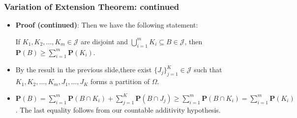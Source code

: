 \documentclass[handout]{beamer}
\newcommand{\BP}{\mathbf{P}}
\begin{document}
\frame
{
  \frametitle{Variation of Extension Theorem: continued}

   \begin{itemize}

       
              \item<1-> []\textbf{Proof (continued)}:  Then we have the following statement:
              
            If $K_1, K_2,\ldots, K_m \in\mathcal{J} $ are disjoint and $\bigcup_{i=1}^m K_i\subseteq B \in \mathcal{J}$, then $\BP(B)\geq \sum_{i=1}^m \BP(K_i)$. 
            
            
            
              
                            \item<2->[-]  By the result in the previous slide,there exist $\{J_j\}_{j=1}^K \in \mathcal{J}$ such that $K_1, K_2,\ldots, K_m, J_1,\ldots, J_K$ forms a partition of $\Omega$. 
            \item<3->[-]                     
     $\BP(B)=\sum_{i=1}^m \BP(B\cap K_i)+ \sum_{j=1}^K \BP(B\cap J_j)\geq \sum_{i=1}^m \BP(B\cap K_i)=\sum_{i=1}^m \BP(K_i)$. The last equality follows from our countable additivity hypothesis.
     
                   \end{itemize}
}
\end{document}
